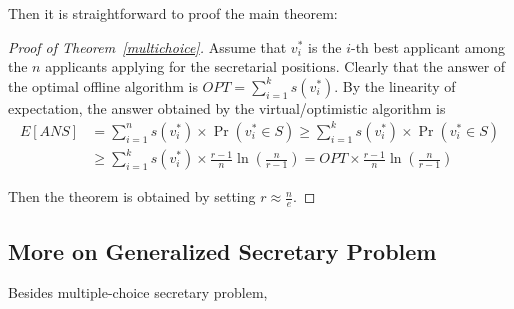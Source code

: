 Then it is straightforward to proof the main theorem:

\begin{proof}[Proof of Theorem~\ref{multichoice}]
    Assume that $v_i^*$ is the $i$-th best applicant among 
    the $n$ applicants applying for the secretarial positions.
    Clearly that the answer of the optimal offline algorithm is 
    $OPT = \sum_{i = 1}^{k} s(v_i^*)$.
    By the linearity of expectation, the answer obtained by
    the virtual/optimistic algorithm is
    \begin{align*}
        E[ANS] &= \sum_{i = 1}^{n} s(v_i^*) \times \Pr(v_i^* \in S)
    \ge \sum_{i=1}^{k} s(v_i^*) \times \Pr(v_i^* \in S) \\
    &\ge \sum_{i=1}^{k} s(v_i^*) \times \frac{r-1}{n} \ln(\frac{n}{r-1})
    = OPT \times \frac{r-1}{n} \ln(\frac{n}{r-1})
    \end{align*}

    Then the theorem is obtained by setting $r \approx \frac{n}{e}$.
\end{proof}

\subsection{More on Generalized Secretary Problem}

Besides multiple-choice secretary problem, 
